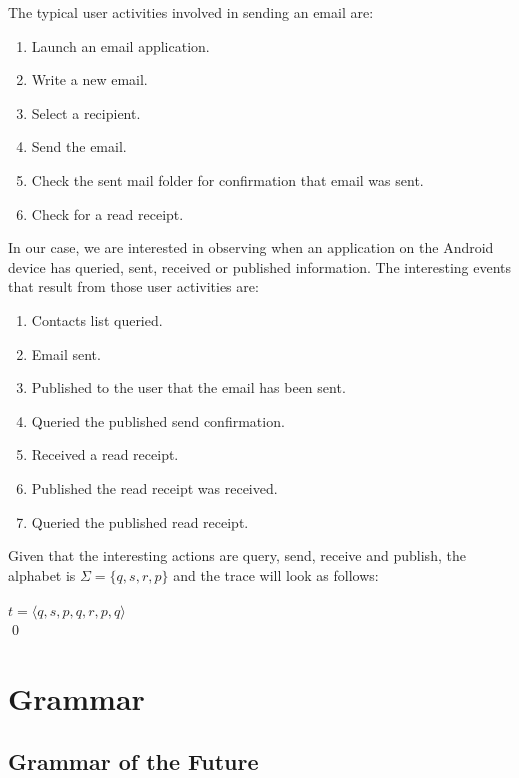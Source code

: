 \begin{myEx}
The typical user activities involved in sending an email are:\\

\begin{enumerate}
\item  Launch an email application.
\item  Write a new email.
\item  Select a recipient.
\item  Send the email.
\item  Check the sent mail folder for confirmation that email was sent.
\item  Check for a read receipt.
\end{enumerate}
\newpage
In our case, we are interested in observing when an application on the Android device has queried, sent, received or published information.  The interesting events that result from those user activities are:

\begin{enumerate}
\item  Contacts list queried.
\item  Email sent.
\item  Published to the user that the email has been sent.
\item  Queried the published send confirmation.
\item  Received a read receipt.
\item  Published the read receipt was received.
\item  Queried the published read receipt.
\end{enumerate}

Given that the interesting actions are query, send, receive and publish, the alphabet is $\Sigma = \{ q, s, r, p \}$ and the trace will look as follows:\\
\\
$ t = \langle q, s, p, q, r, p, q \rangle $\\
\qed
\end{myEx}

\section{Grammar}

\subsection{Grammar of the Future}
\label{sec:LTLFutureGrammar}

